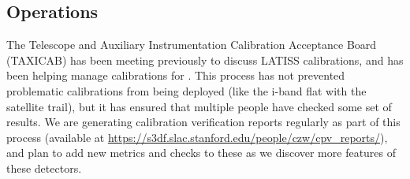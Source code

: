 \subsection{Operations}

The Telescope and Auxiliary Instrumentation Calibration Acceptance Board (TAXICAB) has been meeting previously to discuss LATISS calibrations, and has been helping manage calibrations for \ComCam.
This process has not prevented problematic calibrations from being deployed (like the i-band flat with the satellite trail), but it has ensured that multiple people have checked some set of results.
We are generating calibration verification reports regularly as part of this process (available at \url{https://s3df.slac.stanford.edu/people/czw/cpv_reports/}), and plan to add new metrics and checks to these as we discover more features of these detectors.
